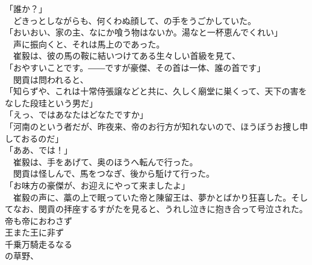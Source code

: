 \documentclass[
  paper=a5,
  fontsize=10pt,
  jafontsize=9.5pt,
  tate,                  %
  open_bracket_pos=nibu, %
]{jlreq}
\begin{document}
「誰か？」\\


　どきっとしながらも、何くわぬ顔して、の手をうごかしていた。\\


「おいおい、家の主、なにか喰う物はないか。湯なと一杯恵んでくれい」\\


　声に振向くと、それは馬上のであった。\\


　崔毅は、彼の馬の鞍に結いつけてある生々しい首級を見て、\\


「おやすいことです。――ですが豪傑、その首は一体、誰の首です」\\


　閔貢は問われると、\\


「知らずや、これは十常侍張譲などと共に、久しく廟堂に巣くって、天下の害をなした段珪という男だ」\\


「えっ、ではあなたはどなたですか」\\


「河南のという者だが、昨夜来、帝のお行方が知れないので、ほうぼうお捜し申しておるのだ」\\


「ああ、では！」\\


　崔毅は、手をあげて、奥のほうへ転んで行った。\\


　閔貢は怪しんで、馬をつなぎ、後から駈けて行った。\\


「お味方の豪傑が、お迎えにやって来ましたよ」\\


　崔毅の声に、藁の上で眠っていた帝と陳留王は、夢かとばかり狂喜した。そしてなお、閔貢の拝座するすがたを見ると、うれし泣きに抱き合って号泣された。\\



帝も帝におわさず\\


王また王に非ず\\


千乗万騎走るなる\\

の草野、\\
\end{document}
